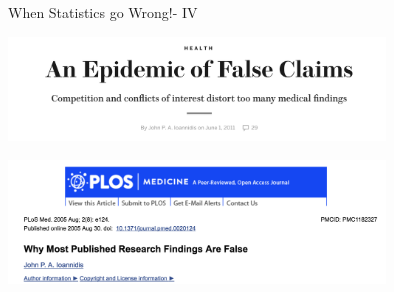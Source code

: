 \documentclass{beamer}\usepackage[]{graphicx}\usepackage[]{color}
\begin{document}
\begin{frame}[fragile]{When Statistics go Wrong!- IV \;\;}

\includegraphics[width=10cm,keepaspectratio]{false_claims.png}

\includegraphics[width=10cm,keepaspectratio]{plos_medicine.png}

\end{frame}
\end{document}
